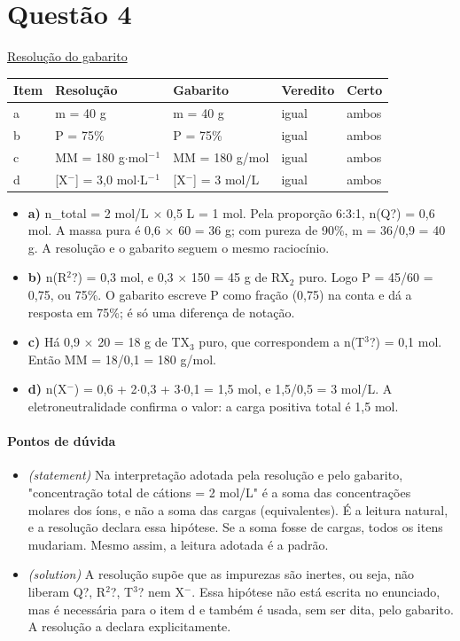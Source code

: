 \documentclass{article}%
\begin{document}
\section*{Questão 4}%
\href{https://poliedroresolve.sistemapoliedro.com.br/vestibulares/ita/2027/ita-2-fase-dia-2-21-10-2026-2-fase-dia-2/dissertativa-4-quimica-2-fase-dia-2-ita-2027}{Resolução do gabarito}\par\smallskip%
\begin{longtable}{@{}p{} p{} p{} p{} p{}@{}}\toprule Item & Resolução & Gabarito & Veredito & Certo \\ \midrule
a & m = 40 g & m = 40 g & igual & ambos \\
b & P = 75\% & P = 75\% & igual & ambos \\
c & MM = 180 g$\cdot$mol$^{-}$$^{1}$ & MM = 180 g/mol & igual & ambos \\
d & {[}X$^{-}${]} = 3,0 mol$\cdot$L$^{-}$$^{1}$ & {[}X$^{-}${]} = 3 mol/L & igual & ambos \\
\bottomrule\end{longtable}%
\begin{itemize}%
\item%
\textbf{a)} n\_total = 2 mol/L $\times$ 0,5 L = 1 mol. Pela proporção 6:3:1, n(Q?) = 0,6 mol. A massa pura é 0,6 $\times$ 60 = 36 g; com pureza de 90\%, m = 36/0,9 = 40 g. A resolução e o gabarito seguem o mesmo raciocínio.%
\item%
\textbf{b)} n(R$^2$?) = 0,3 mol, e 0,3 $\times$ 150 = 45 g de RX$_{2}$ puro. Logo P = 45/60 = 0,75, ou 75\%. O gabarito escreve P como fração (0,75) na conta e dá a resposta em 75\%; é só uma diferença de notação.%
\item%
\textbf{c)} Há 0,9 $\times$ 20 = 18 g de TX$_{3}$ puro, que correspondem a n(T$^3$?) = 0,1 mol. Então MM = 18/0,1 = 180 g/mol.%
\item%
\textbf{d)} n(X$^{-}$) = 0,6 + 2$\cdot$0,3 + 3$\cdot$0,1 = 1,5 mol, e 1,5/0,5 = 3 mol/L. A eletroneutralidade confirma o valor: a carga positiva total é 1,5 mol.%
\end{itemize}%
\paragraph{Pontos de dúvida}%
\begin{itemize}%
\item%
\textit{(statement)} Na interpretação adotada pela resolução e pelo gabarito, "concentração total de cátions = 2 mol/L" é a soma das concentrações molares dos íons, e não a soma das cargas (equivalentes). É a leitura natural, e a resolução declara essa hipótese. Se a soma fosse de cargas, todos os itens mudariam. Mesmo assim, a leitura adotada é a padrão.%
\item%
\textit{(solution)} A resolução supõe que as impurezas são inertes, ou seja, não liberam Q?, R$^2$?, T$^3$? nem X$^{-}$. Essa hipótese não está escrita no enunciado, mas é necessária para o item d e também é usada, sem ser dita, pelo gabarito. A resolução a declara explicitamente.%
\end{itemize}%
\end{document}
